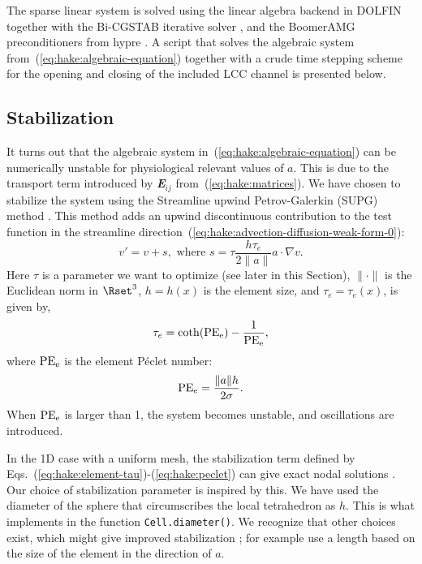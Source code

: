 The sparse linear system is solved using the \petsc linear algebra
backend \citep{BalayBuschelmanGroppEtAl2001} in DOLFIN together with
the Bi-CGSTAB iterative solver \citep{Vorst1992}, and the BoomerAMG
preconditioners from hypre \citep{FalgoutYang2002}. A script that
solves the algebraic system from~(\ref{eq:hake:algebraic-equation})
together with a crude time stepping scheme for the opening and closing
of the included LCC channel is presented below.

\subsection{Stabilization}
\label{sec:hake:stabilization}

It turns out that the algebraic system
in~(\ref{eq:hake:algebraic-equation}) can be numerically unstable for
physiological relevant values of $a$. This is due to the transport
term introduced by {\bfseries\itshape E}$_{ij}$
from~(\ref{eq:hake:matrices}). We have chosen to stabilize the system
using the Streamline upwind Petrov-Galerkin (SUPG) method
\citep{BrooksHughes1982}. This method adds an upwind discontinuous
contribution to the test function in the streamline
direction~(\ref{eq:hake:advection-diffusion-weak-form-0}):
\begin{equation}
  \label{eq:hake:stabilizing-term}
  v' = v+s, \text{ where } s = \tau\frac{h\tau_e}{2\|a\|}a\cdot\nabla v.
\end{equation}
Here $\tau$ is a parameter we want to optimize (see later in this
Section), $\|\cdot\|$ is the Euclidean norm in $\Rset^3$, $h=h(x)$ is
the element size, and $\tau_e=\tau_e(x)$, is given by,
\begin{equation}
  \label{eq:hake:element-tau}
  \tau_e=\coth(\mathrm{PE}_{\mathrm{e}})-\frac{1}{\mathrm{PE}_{\mathrm{e}}},
\end{equation}
where $\mathrm{PE}_{\mathrm{e}}$ is the element P\'eclet number:
\begin{equation}
  \label{eq:hake:peclet}
  \mathrm{PE}_{\mathrm{e}} = \frac{\|a\|h}{2\sigma}.
\end{equation}
When $\mathrm{PE}_{\mathrm{e}}$ is larger than 1, the system becomes unstable, and
oscillations are introduced.

In the 1D case with a uniform mesh, the stabilization term defined by
Eqs.~(\ref{eq:hake:element-tau})-(\ref{eq:hake:peclet}) can give exact
nodal solutions
\citep{ChristieGriffithsMitchellEtAl1976,BrooksHughes1982}. Our choice
of stabilization parameter is inspired by this. We have used the
diameter of the sphere that circumscribes the local tetrahedron as
$h$. This is what \dolfin implements in the function
\texttt{Cell.diameter()}. We recognize that other choices exist, which
might give improved stabilization \citep{JohnKnobloch2007}; for example
\citet{TezduyarPark1986} use a length based on the size of the element
in the direction of $a$.

